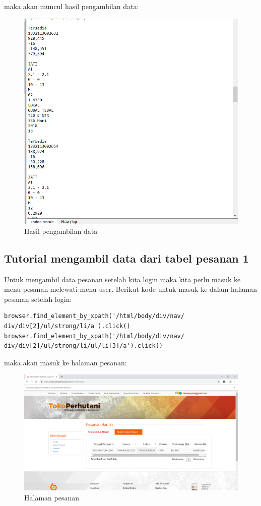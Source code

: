 maka akan muncul hasil pengambilan data:
\begin{figure}[h]
	\centering
	\includegraphics[scale=0.30]{figures/7dataambil}
	\caption{Hasil pengambilan data}
\end{figure}
\newpage
\subsection{Tutorial mengambil data dari tabel pesanan 1}
Untuk mengambil data pesanan setelah kita login maka kita perlu masuk ke menu pesanan melewati menu user.
Berikut kode untuk masuk ke dalam halaman pesanan setelah login:
\begin{verbatim}
browser.find_element_by_xpath('/html/body/div/nav/
div/div[2]/ul/strong/li/a').click()
browser.find_element_by_xpath('/html/body/div/nav/
div/div[2]/ul/strong/li/ul/li[3]/a').click()
\end{verbatim}
maka akan masuk ke halaman pesanan:
\begin{figure}[h]
	\centering
	\includegraphics[scale=0.30]{figures/8pesanan}
	\caption{Halaman pesanan}
\end{figure}

